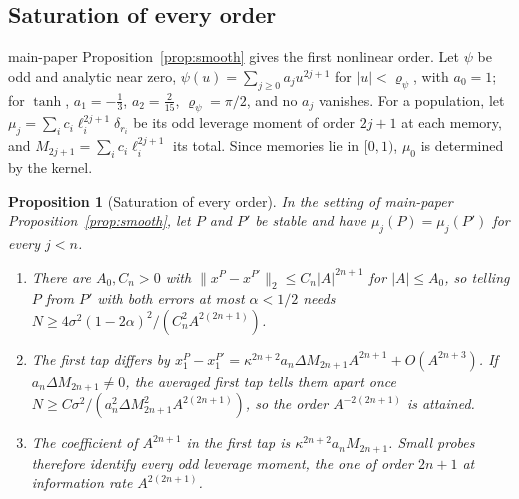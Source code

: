 \documentclass[12pt]{article}
\newtheorem{proposition}[theorem]{Proposition}
\theoremstyle{definition}
\theoremstyle{remark}
\begin{document}
\subsection{Saturation of every order}

main-paper Proposition~\ref{prop:smooth} gives the first nonlinear order. Let $\psi$ be odd and analytic near zero, $\psi(u)=\sum_{j\ge0}a_ju^{2j+1}$ for $|u|<\varrho_\psi$, with $a_0=1$; for $\tanh$, $a_1=-\frac13$, $a_2=\frac2{15}$, $\varrho_\psi=\pi/2$, and no $a_j$ vanishes. For a population, let $\mu_j=\sum_ic_i\ell_i^{2j+1}\delta_{r_i}$ be its odd leverage moment of order $2j+1$ at each memory, and $M_{2j+1}=\sum_ic_i\ell_i^{2j+1}$ its total. Since memories lie in $[0,1)$, $\mu_0$ is determined by the kernel.

\begin{proposition}[Saturation of every order]\label{prop:smoothn}
In the setting of main-paper Proposition~\ref{prop:smooth}, let $P$ and $P'$ be stable and have $\mu_j(P)=\mu_j(P')$ for every $j<n$.
\begin{enumerate}[label=(\roman*),itemsep=1pt]
\item There are $A_0,C_n>0$ with $\|x^P-x^{P'}\|_2\le C_n|A|^{2n+1}$ for $|A|\le A_0$, so telling $P$ from $P'$ with both errors at most $\alpha<1/2$ needs $N\ge4\sigma^2(1-2\alpha)^2/(C_n^2A^{2(2n+1)})$.
\item The first tap differs by $x^P_1-x^{P'}_1=\kappa^{2n+2}a_n\Delta M_{2n+1}A^{2n+1}+O(A^{2n+3})$. If $a_n\Delta M_{2n+1}\ne0$, the averaged first tap tells them apart once $N\ge C\sigma^2/(a_n^2\Delta M_{2n+1}^2A^{2(2n+1)})$, so the order $A^{-2(2n+1)}$ is attained.
\item The coefficient of $A^{2n+1}$ in the first tap is $\kappa^{2n+2}a_nM_{2n+1}$. Small probes therefore identify every odd leverage moment, the one of order $2n+1$ at information rate $A^{2(2n+1)}$.
\end{enumerate}
\end{proposition}
\end{document}

